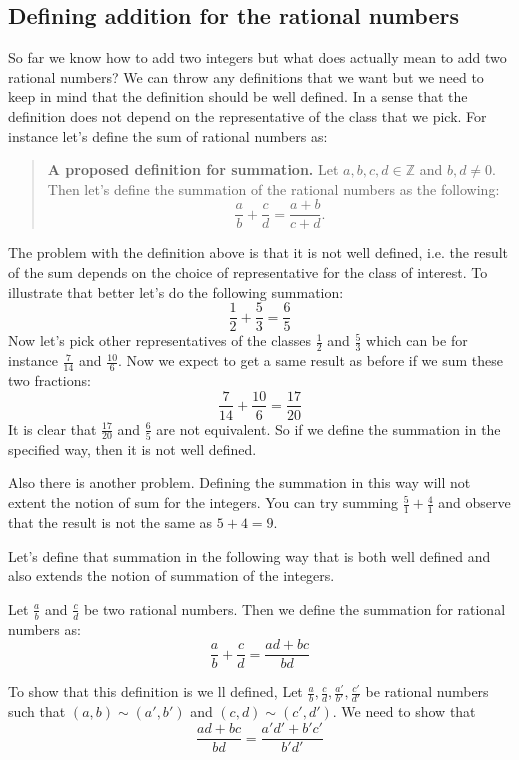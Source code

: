 \subsection{Defining addition for the rational numbers}
So far we know how to add two integers but what does actually mean to add two rational numbers? We can throw any definitions that we want but we need to keep in mind that the definition should be well defined. In a sense that the definition does not depend on the representative of the class that we pick. For instance let's define the sum of rational numbers as:

\begin{quote}
	\textbf{A proposed definition for summation.} Let $ a,b,c,d \in \mathbb{Z} $ and $ b,d \neq 0 $. Then let's define the summation of the rational numbers as the following:
	\[ \frac{a}{b} + \frac{c}{d} = \frac{a+b}{c+d}.  \]
\end{quote}

The problem with the definition above is that it is not well defined, i.e. the result of the sum depends on the choice of representative for the class of interest. To illustrate that better let's do the following summation:
\[ \frac{1}{2} + \frac{5}{3} = \frac{6}{5} \]
Now let's pick other representatives of the classes $ \frac{1}{2} $ and $ \frac{5}{3} $ which can be for instance $ \frac{7}{14} $ and $ \frac{10}{6} $. Now we expect to get a same result as before if we sum these two fractions:
\[ \frac{7}{14} + \frac{10}{6} = \frac{17}{20}  \]
It is clear that $ \frac{17}{20} $ and $ \frac{6}{5} $ are not equivalent. So if we define the summation in the specified way, then it is not well defined. 

Also there is another problem. Defining the summation in this way will not extent the notion of sum for the integers. You can try summing $ \frac{5}{1} + \frac{4}{1} $ and observe that the result is not the same as $ 5+4=9 $.

Let's define that summation in the following way that is both well defined and also extends the notion of summation of the integers. 

\begin{definition}
	Let $ \frac{a}{b} $ and $ \frac{c}{d} $ be two rational numbers. Then we define the summation for rational numbers as:
	\[ \frac{a}{b} + \frac{c}{d} = \frac{ad + bc}{bd} \]
\end{definition}

To show that this definition is we ll defined, Let $ \frac{a}{b},\frac{c}{d},\frac{a'}{b'},\frac{c'}{d'} $ be rational numbers such that $ (a,b) \sim (a',b') $ and $ (c,d) \sim (c', d') $. We need to show that
 \[ \frac{ad+bc}{bd} = \frac{a'd' + b'c'}{b'd'} \]
 
